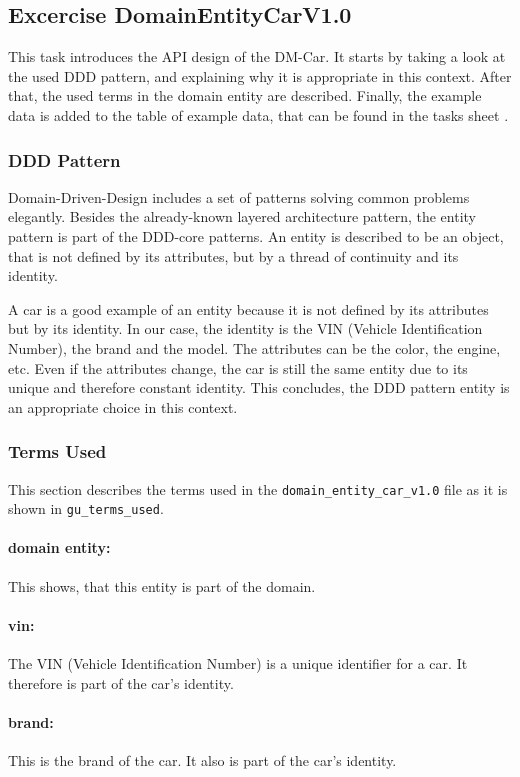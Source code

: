 \subsection{Excercise DomainEntityCarV1.0}
\label{subsec:domain_entity_car_v1.0}
This task introduces the API design of the DM-Car.
It starts by taking a look at the used DDD pattern, and explaining why it is appropriate in this context.
After that, the used terms in the domain entity are described.
Finally, the example data is added to the table of example data, that can be found in the tasks sheet \cite{CM-T-DMC}.

\subsubsection*{DDD Pattern}
\label{subsubsec:ddd_pattern}
Domain-Driven-Design includes a set of patterns solving common problems elegantly.
Besides the already-known layered architecture pattern, the entity pattern is part of the DDD-core patterns.
An entity is described to be an object, that is not defined by its attributes, but by a thread of continuity and its identity.

A car is a good example of an entity because it is not defined by its attributes but by its identity.
In our case, the identity is the VIN (Vehicle Identification Number), the brand and the model.
The attributes can be the color, the engine, etc.
Even if the attributes change, the car is still the same entity due to its unique and therefore constant identity.
This concludes, the DDD pattern entity is an appropriate choice in this context.

\subsubsection*{Terms Used}
This section describes the terms used in the \texttt{domain\_entity\_car\_v1.0} file as it is shown in \texttt{gu\_terms\_used}.
\paragraph*{domain entity:}
This shows, that this entity is part of the domain.
\paragraph*{vin:}
The VIN (Vehicle Identification Number) is a unique identifier for a car.
It therefore is part of the car's identity.
\paragraph*{brand:}
This is the brand of the car.
It also is part of the car's identity.
